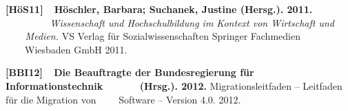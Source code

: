 \documentclass[a4paper]{article}
\begin{document}
{\sffamily
\textbf{\textcolor[rgb]{0.12941177,0.11764706,0.11764706}{[HöS11]\ \ Höschler, Barbara; Suchanek, Justine (Hersg.).
2011. \ \ \ \ \ \ \ \ }}\textit{\textcolor[rgb]{0.12941177,0.11764706,0.11764706}{Wissenschaft und Hochschulbildung im
Kontext von Wirtschaft und \ \ \ \ Medien.}}\textcolor[rgb]{0.12941177,0.11764706,0.11764706}{ VS Verlag f\"{u}r
Sozialwissenschaften {\textbar} Springer Fachmedien \ \ \ \ Wiesbaden GmbH 2011.}}

{\sffamily
\textbf{\textcolor[rgb]{0.12941177,0.11764706,0.11764706}{[BBI12]\ \ Die Beauftragte der Bundesregierung f\"{u}r
Informationstechnik \ \ \ \ \ \ (Hrsg.). 2012.}}\textcolor[rgb]{0.12941177,0.11764706,0.11764706}{ Migrationsleitfaden
– Leitfaden für die Migration von \ \ \ \ Software – Version 4.0. 2012.}}


\bigskip
\end{document}
